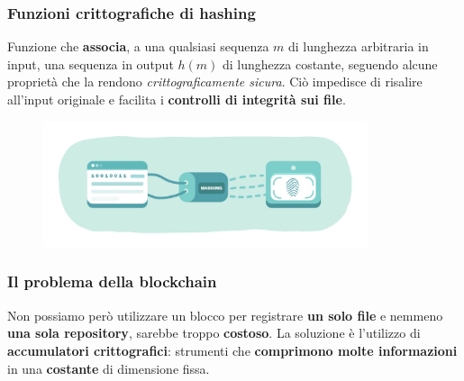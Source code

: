 \documentclass{beamer}
\begin{document}
\begin{frame}
	\frametitle{Funzioni crittografiche di hashing}
	Funzione che \textbf{associa},
	a una qualsiasi sequenza \(m\) di lunghezza arbitraria in input, una sequenza
	in output \(h(m)\) di lunghezza costante,
	seguendo alcune proprietà che la rendono
	\emph{crittograficamente sicura}.
	Ciò impedisce di risalire all'input originale
	e facilita i \textbf{controlli di integrità sui file}.
	\begin{figure}
		\includegraphics[width=0.85\textwidth]{figures/hashing.jpg}
	\end{figure}
\end{frame}

\begin{frame}
	\frametitle{Il problema della blockchain}
	Non possiamo però utilizzare un blocco per registrare \textbf{un solo file}
	e nemmeno \textbf{una sola repository}, sarebbe troppo \textbf{costoso}.
	La soluzione è l'utilizzo di \textbf{accumulatori crittografici}:
	strumenti che \textbf{comprimono molte informazioni}
	in una \textbf{costante} di dimensione fissa.
\end{frame}
\end{document}
